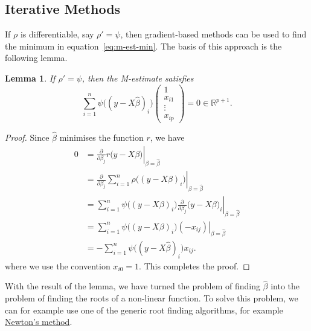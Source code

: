 \documentclass[
  a4paper,
]{article}
\newtheorem{lemma}{Lemma}[section]
\theoremstyle{definition}
\theoremstyle{definition}
\theoremstyle{definition}
\theoremstyle{definition}
\theoremstyle{remark}
\begin{document}
\hypertarget{iterative-methods}{%
\subsection{Iterative Methods}\label{iterative-methods}}

If \(\rho\) is differentiable, say \(\rho' = \psi\), then gradient-based methods
can be used to find the minimum in equation~\eqref{eq:m-est-min}. The basis of
this approach is the following lemma.

\begin{lemma}
If \(\rho' = \psi\), then the M-estimate satisfies
\begin{equation}
  \sum_{i=1}^n \psi\bigl( (y - X\hat\beta)_i \bigr)
    \begin{pmatrix}
      1 \\ x_{i1} \\ \vdots \\ x_{ip}
    \end{pmatrix}
  = 0 \in \mathbb{R}^{p+1}.  \label{eq:psi-root}
\end{equation}
\end{lemma}

\begin{proof}
Since \(\hat\beta\) minimises the function \(r\), we have
\begin{align*}
  0
  &= \left. \frac{\partial}{\partial\beta_j} r\bigl( y - X\beta \bigr) \right|_{\beta=\hat\beta} \\
  &= \left. \frac{\partial}{\partial\beta_j} \sum_{i=1}^n \rho\bigl( (y - X\beta)_i \bigr) \right|_{\beta=\hat\beta} \\
  &= \left. \sum_{i=1}^n \psi\bigl( (y - X\beta)_i \bigr) \frac{\partial}{\partial\beta_j} \bigl( y - X\beta \bigr)_i \right|_{\beta=\hat\beta} \\
  &= \left. \sum_{i=1}^n \psi\bigl( (y - X\beta)_i \bigr) (-x_{ij}) \right|_{\beta=\hat\beta} \\
  &= - \sum_{i=1}^n \psi\bigl( (y - X\hat\beta)_i \bigr) x_{ij}.
\end{align*}
where we use the convention \(x_{i0} = 1\). This completes the proof.
\end{proof}

With the result of the lemma, we have turned the problem of finding
\(\hat\beta\) into the problem of finding the roots of a non-linear
function. To solve this problem, we can for example use one
of the generic root finding algorithms, for example
\href{https://en.wikipedia.org/wiki/Newton\%27s_method}{Newton's method}.
\end{document}
